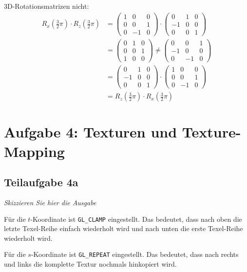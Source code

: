 \documentclass[a4paper]{scrartcl}
\begin{document}
3D-Rotationsmatrizen nicht:
\begin{align}
R_x(\frac{3}{2}\pi) \cdot R_z(\frac{3}{2}\pi)
&= \begin{pmatrix}1 & 0 & 0\\ 0 & 0 & 1\\0 & -1 & 0\end{pmatrix} \cdot
  \begin{pmatrix}0 & 1 & 0\\-1 & 0 & 0\\0 &  0 & 1\end{pmatrix} \\
 &=
  \begin{pmatrix}0 & 1 & 0\\ 0 & 0 & 1\\1 &  0 & 0\end{pmatrix} \neq
  \begin{pmatrix}0 & 0 & 1\\-1 & 0 & 0\\0 & -1 & 0\end{pmatrix} \\
 &=
  \begin{pmatrix}0 & 1 & 0\\-1 & 0 & 0\\0 &  0 & 1\end{pmatrix} \cdot
  \begin{pmatrix}1 & 0 & 0\\ 0 & 0 & 1\\0 & -1 & 0\end{pmatrix} \\
 &= R_z(\frac{3}{2}\pi) \cdot R_x(\frac{3}{2}\pi)
\end{align}

\section*{Aufgabe 4: Texturen und Texture-Mapping}
\subsection*{Teilaufgabe 4a}
\textit{Skizzieren Sie hier die Ausgabe}

Für die $t$-Koordinate ist \texttt{GL\_CLAMP} eingestellt. Das bedeutet, dass
nach oben die letzte Texel-Reihe einfach wiederholt wird und nach unten die
erste Texel-Reihe wiederholt wird.

Für die $s$-Koordinate ist \texttt{GL\_REPEAT} eingestellt. Das bedeutet, dass
nach rechts und links die komplette Textur nochmals hinkopiert wird.
\end{document}
